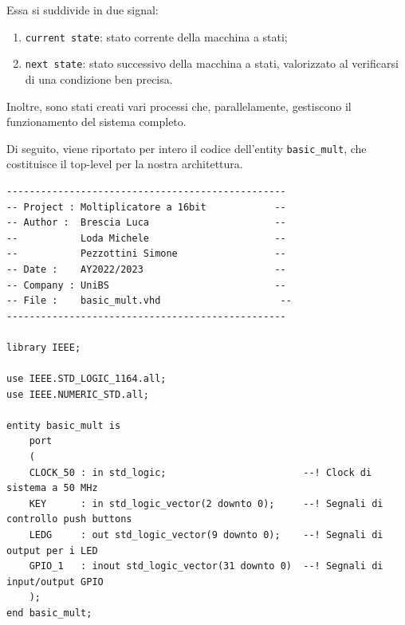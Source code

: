 \documentclass[titlepage]{report}
\begin{document}
		Essa si suddivide in due signal:
		\begin{enumerate}
			\item \texttt{current state}: stato corrente della macchina a stati;
			\item \texttt{next state}: stato successivo della macchina a stati, valorizzato al verificarsi di una condizione ben precisa.
		\end{enumerate}

		Inoltre, sono stati creati vari processi che, parallelamente, gestiscono il funzionamento del sistema completo.

		Di seguito, viene riportato per intero il codice dell'entity \texttt{basic\_mult}, che costituisce il top-level per la nostra architettura.

		\begin{lstlisting}[caption={Top level implementato per la nostra architettura}, label={lst:mul16_process}]
-------------------------------------------------
-- Project : Moltiplicatore a 16bit            --
-- Author :  Brescia Luca                      -- 
--           Loda Michele                      --
--           Pezzottini Simone                 --
-- Date : 	 AY2022/2023                       --
-- Company : UniBS                             --
-- File : 	 basic_mult.vhd       		        --
-------------------------------------------------

library IEEE;

use IEEE.STD_LOGIC_1164.all;
use IEEE.NUMERIC_STD.all;

entity basic_mult is
	port
	(
	CLOCK_50 : in std_logic;                        --! Clock di sistema a 50 MHz
	KEY      : in std_logic_vector(2 downto 0);     --! Segnali di controllo push buttons
	LEDG     : out std_logic_vector(9 downto 0);    --! Segnali di output per i LED
	GPIO_1   : inout std_logic_vector(31 downto 0)  --! Segnali di input/output GPIO
	);
end basic_mult;


\end{lstlisting}
\end{document}
